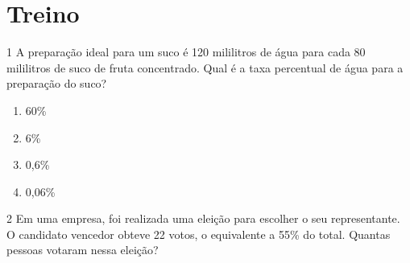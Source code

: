 








\section{Treino}

\num{1} A preparação ideal para um suco é 120 mililitros de água para cada 80
mililitros de suco de fruta concentrado. Qual é a taxa percentual de
água para a preparação do suco?

\begin{enumerate}
\item 60\%
\item 6\%
\item 0,6\%
\item 0,06\%
\end{enumerate}












\num{2} Em uma empresa, foi realizada uma eleição para escolher o seu
representante. O candidato vencedor obteve 22 votos, o equivalente a
55\% do total. Quantas pessoas votaram nessa eleição?

